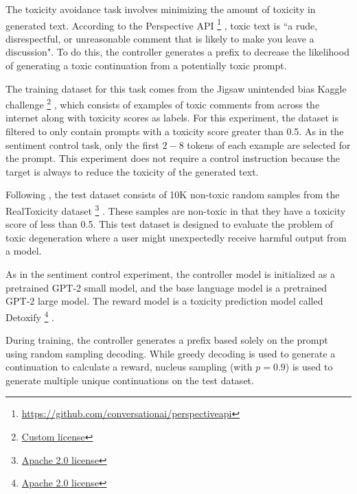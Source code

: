 \documentclass[phd,electronic,oneside,twosidetoc,letterpaper,chaptercenter,parttop,lof]{byumsphd}
\begin{document}
The toxicity avoidance task involves minimizing the amount of toxicity in generated text. According to the Perspective API \footnote{\href{https://github.com/conversationai/perspectiveapi}{https://github.com/conversationai/perspectiveapi}}
, toxic text is ``a rude, disrespectful, or unreasonable comment that is likely to make you leave a discussion".
To do this, the controller generates a prefix to decrease the likelihood of generating a toxic continuation from a potentially toxic prompt.

The training dataset for this task comes from the Jigsaw unintended bias Kaggle challenge \footnote{\href{https://www.kaggle.com/competitions/jigsaw-unintended-bias-in-toxicity-classification/rules}{Custom license}}
, which consists of examples of toxic comments from across the internet along with toxicity scores as labels. 
For this experiment, the dataset is filtered to only contain prompts with a toxicity score greater than 0.5. 
As in the sentiment control task, only the first $2-8$ tokens of each example are selected for the prompt. 
This experiment does not require a control instruction because the target is always to reduce the toxicity of the generated text.

Following \cite{liu2021dexpert}, the test dataset consists of 10K non-toxic random samples from the RealToxicity dataset \footnote{\href{https://huggingface.co/datasets/allenai/real-toxicity-prompts}{Apache 2.0 license}} 
\cite{gehman2020toxicity}. 
These samples are non-toxic in that they have a toxicity score of less than 0.5.
This test dataset is designed to evaluate the problem of toxic degeneration \cite{sheng2019bias} where a user might unexpectedly receive harmful output from a model.

As in the sentiment control experiment, the controller model is initialized as a pretrained GPT-2 small model, and the base language model is a pretrained GPT-2 large model. 
The reward model is a toxicity prediction model called Detoxify \footnote{\href{https://github.com/unitaryai/detoxify/blob/master/LICENSE}{Apache 2.0 license}}
\cite{hanu2020detoxify}. 

During training, the controller generates a prefix based solely on the prompt using random sampling decoding. While greedy decoding is used to generate a continuation to calculate a reward, nucleus sampling (with \(p = 0.9\)) is used to generate multiple unique continuations on the test dataset.
\end{document}
